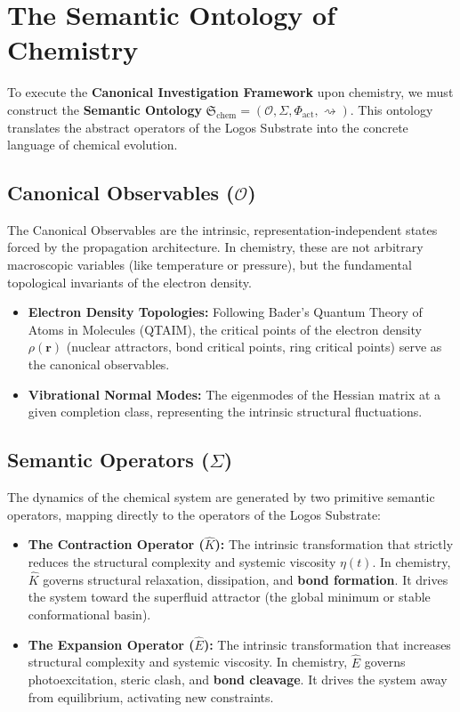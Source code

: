 \documentclass[11pt,openany]{extbook}
\theoremstyle{plain}
\theoremstyle{definition}
\begin{document}
\section{The Semantic Ontology of Chemistry}

To execute the \textbf{Canonical Investigation Framework} upon chemistry, we must construct the \textbf{Semantic Ontology} $\mathfrak{S}_{\text{chem}} = (\mathcal{O}, \Sigma, \Phi_{\text{act}}, \rightsquigarrow)$. This ontology translates the abstract operators of the Logos Substrate into the concrete language of chemical evolution.

\subsection{Canonical Observables ($\mathcal{O}$)}
The Canonical Observables are the intrinsic, representation-independent states forced by the propagation architecture. In chemistry, these are not arbitrary macroscopic variables (like temperature or pressure), but the fundamental topological invariants of the electron density.
\begin{itemize}
\item \textbf{Electron Density Topologies:} Following Bader's Quantum Theory of Atoms in Molecules (QTAIM), the critical points of the electron density $\rho(\mathbf{r})$ (nuclear attractors, bond critical points, ring critical points) serve as the canonical observables.
\item \textbf{Vibrational Normal Modes:} The eigenmodes of the Hessian matrix at a given completion class, representing the intrinsic structural fluctuations.
\end{itemize}

\subsection{Semantic Operators ($\Sigma$)}
The dynamics of the chemical system are generated by two primitive semantic operators, mapping directly to the operators of the Logos Substrate:
\begin{itemize}
\item \textbf{The Contraction Operator ($\hat{K}$):} The intrinsic transformation that strictly reduces the structural complexity and systemic viscosity $\eta(t)$. In chemistry, $\hat{K}$ governs structural relaxation, dissipation, and \textbf{bond formation}. It drives the system toward the superfluid attractor (the global minimum or stable conformational basin).
\item \textbf{The Expansion Operator ($\hat{E}$):} The intrinsic transformation that increases structural complexity and systemic viscosity. In chemistry, $\hat{E}$ governs photoexcitation, steric clash, and \textbf{bond cleavage}. It drives the system away from equilibrium, activating new constraints.
\end{itemize}
\end{document}

